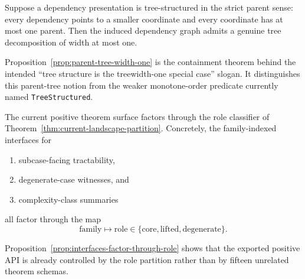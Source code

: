\begin{proposition}\label{prop:parent-tree-width-one}
Suppose a dependency presentation is tree-structured in the strict parent sense: every dependency points to a smaller coordinate and every coordinate has at most one parent. Then the induced dependency graph admits a genuine tree decomposition of width at most one.
\end{proposition}

Proposition~\ref{prop:parent-tree-width-one} is the containment theorem behind the intended ``tree structure is the treewidth-one special case'' slogan. It distinguishes this parent-tree notion from the weaker monotone-order predicate currently named \texttt{TreeStructured}.

\begin{proposition}\label{prop:interfaces-factor-through-role}
The current positive theorem surface factors through the role classifier of Theorem~\ref{thm:current-landscape-partition}. Concretely, the family-indexed interfaces for
\begin{enumerate}
\item subcase-facing tractability,
\item degenerate-case witnesses, and
\item complexity-class summaries
\end{enumerate}
all factor through the map
\[
\text{family} \longmapsto \text{role} \in \{\text{core},\text{lifted},\text{degenerate}\}.
\]
\end{proposition}

Proposition~\ref{prop:interfaces-factor-through-role} shows that the exported positive API is already controlled by the role partition rather than by fifteen unrelated theorem schemas.
